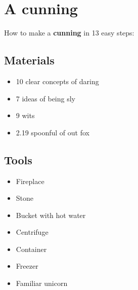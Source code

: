 \documentclass{article}
\begin{document}
\section{A cunning}How to make a \textbf{cunning} in 13 easy steps:

\subsection{Materials}\begin{itemize}
\item 
10 clear concepts of daring
\item 
7 ideas of being sly
\item 
9 wits
\item 
2.19 spoonful of out fox
\end{itemize}
\subsection{Tools}\begin{itemize}
\item 
Fireplace
\item 
Stone
\item 
Bucket with hot water
\item 
Centrifuge
\item 
Container
\item 
Freezer
\item 
Familiar unicorn
\end{itemize}
\end{document}
